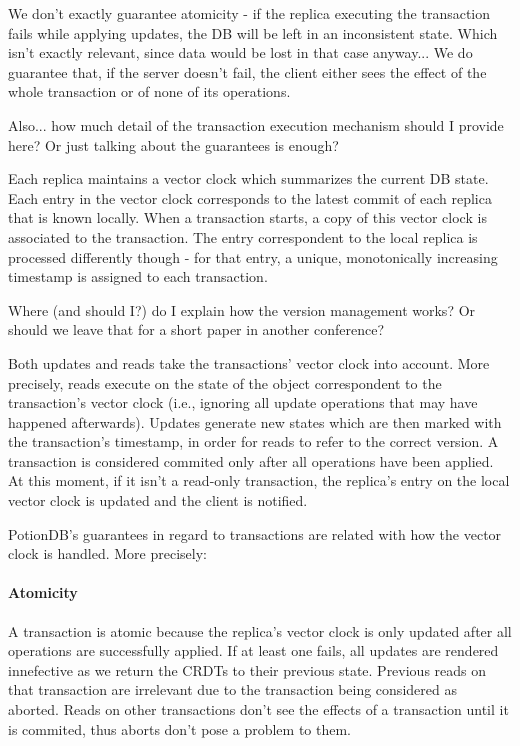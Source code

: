 \documentclass{vldb}
\newcommand{\grumbler}[2]{{\color{red}{\bf #1:} #2}}
\newcommand{\andre}[1]{\grumbler{andre}{#1}}
\begin{document}
\andre{We don't exactly guarantee atomicity - if the replica executing the transaction fails while applying updates, the DB will be left in an inconsistent state. Which isn't exactly relevant, since data would be lost in that case anyway... We do guarantee that, if the server doesn't fail, the client either sees the effect of the whole transaction or of none of its operations.}

\andre{Also... how much detail of the transaction execution mechanism should I provide here? Or just talking about the guarantees is enough?}

Each replica maintains a vector clock which summarizes the current DB state.
Each entry in the vector clock corresponds to the latest commit of each replica that is known locally.
When a transaction starts, a copy of this vector clock is associated to the transaction.
The entry correspondent to the local replica is processed differently though - for that entry, a unique, monotonically increasing timestamp is assigned to each transaction.

\andre{Where (and should I?) do I explain how the version management works? Or should we leave that for a short paper in another conference?}

Both updates and reads take the transactions' vector clock into account.
More precisely, reads execute on the state of the object correspondent to the transaction's vector clock (i.e., ignoring all update operations that may have happened afterwards).
Updates generate new states which are then marked with the transaction's timestamp, in order for reads to refer to the correct version.
A transaction is considered commited only after all operations have been applied. 
At this moment, if it isn't a read-only transaction, the replica's entry on the local vector clock is updated and the client is notified.

PotionDB's guarantees in regard to transactions are related with how the vector clock is handled. More precisely:


\paragraph{Atomicity}  A transaction is atomic because the replica's vector clock is only updated after all operations are successfully applied. 
If at least one fails, all updates are rendered innefective as we return the CRDTs to their previous state.
Previous reads on that transaction are irrelevant due to the transaction being considered as aborted.
Reads on other transactions don't see the effects of a transaction until it is commited, thus aborts don't pose a problem to them.
\end{document}
